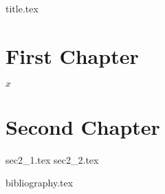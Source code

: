 \documentclass[lualatex,ja=standard]{bxjsbook}
\begin{document}
\frontmatter{}
{title.tex}

\clearpage
\thispagestyle{empty}

\tableofcontents

\mainmatter{}
\chapter{First Chapter}
\(x\)
\chapter{Second Chapter}
{sec2_1.tex}
{sec2_2.tex}

\backmatter{}

{bibliography.tex}
\end{document}
